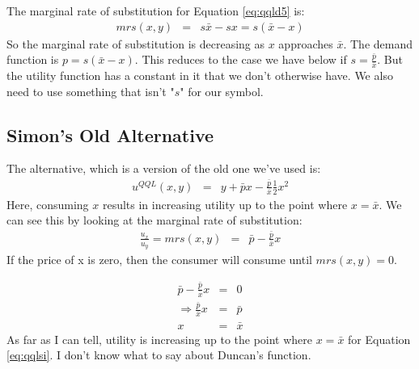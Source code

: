 \documentclass{tufte-handout}
\begin{document}
The marginal rate of substitution for Equation \ref{eq:qqld5} is: 
\begin{eqnarray}
mrs(x,y) & = & s \bar{x} - s x = s(\bar{x} - x)
\end{eqnarray}
So the marginal rate of substitution is decreasing as $x$ approaches $\bar{x}$. The demand function is $p = s(\bar{x} - x)$. This reduces to the case we have below if $s = \frac{\bar{p}}{\bar{x}}$. But the utility function has a constant in it that we don't otherwise have. We also need to use something that isn't "$s$" for our symbol. 

\subsection{Simon's Old Alternative}
The alternative, which is a version of the old one we've used is: 
\begin{eqnarray}
u^{QQL}(x,y) & = & y + \bar{p}x - \frac{\bar{p}}{\bar{x}}\frac{1}{2} x^2 \label{eq:qqlsi}
\end{eqnarray}
Here, consuming $x$ results in increasing utility up to the point where $x = \bar{x}$. We can see this by looking at the marginal rate of substitution: 
\begin{eqnarray}
\frac{u_x}{u_y} = mrs(x,y) & = & \bar{p} -\frac{\bar{p}}{\bar{x}}x 
\end{eqnarray}
If the price of x is zero, then the consumer will consume until $mrs(x,y) = 0$. 


\begin{eqnarray}
 \bar{p} -\frac{\bar{p}}{\bar{x}}x &=& 0  \nonumber \\
\Rightarrow  \frac{\bar{p}}{\bar{x}}x  &=& \bar{p}  \nonumber \\
x &= & \bar{x} \nonumber
\end{eqnarray}
As far as I can tell, utility is increasing up to the point where $x = \bar{x}$ for Equation \ref{eq:qqlsi}. I don't know what to say about Duncan's function. 
\end{document}
